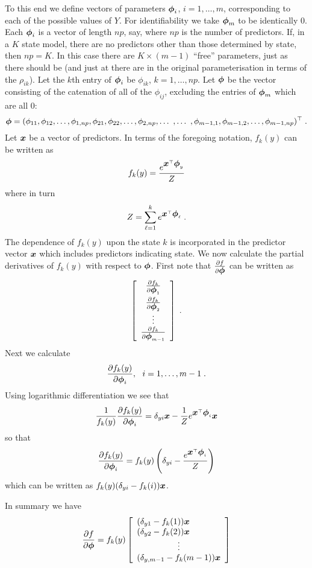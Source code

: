 To this end we define vectors of parameters $\mbox{$\boldsymbol{\phi}$}_i$, $i = 1,
\ldots, m$, corresponding to each of the possible values of $Y$.
For identifiability we take $\mbox{$\boldsymbol{\phi}$}_m$ to be identically 0.
Each $\mbox{$\boldsymbol{\phi}$}_i$ is a vector of length $np$, say, where $np$ is the
number of predictors.  If, in a $K$ state model, there are no
predictors other than those determined by state, then $np = K$.
In this case there are $K \times (m-1)$ ``free'' parameters,
just as there should be (and just at there are in the original
parameterisation in terms of the $\rho_{ik}$).  Let the $k$th
entry of $\mbox{$\boldsymbol{\phi}$}_i$ be $\phi_{ik}$, $k = 1,\ldots,np$.  Let $\mbox{$\boldsymbol{\phi}$}$
be the vector consisting of the catenation of all of the $\phi_{ij}$,
excluding the entries of $\mbox{$\boldsymbol{\phi}$}_m$ which are all 0:
\[
\mbox{$\boldsymbol{\phi}$} = (\phi_{11}, \phi_{12}, \ldots, \phi_{1,np}, \phi_{21}, \phi_{22}, \ldots,
\phi_{2,np}, \ldots\ , \ldots\ ,\phi_{m-1,1}, \phi_{m-1,2},
\ldots, \phi_{m-1,np})^{\top} \; .
\]
Let $\mbox{$\boldsymbol{x}$}$ be a vector of predictors.  In terms of the foregoing notation, $f_k(y)$
can be written as
\[
f_k(y) = \frac{e^{\mbox{$\boldsymbol{x}$}^{\top} \mbox{$\boldsymbol{\phi}$}_y}}{Z}
\]
where in turn
\[
Z = \sum_{\ell = 1}^k e^{\mbox{$\boldsymbol{x}$}^{\top} \mbox{$\boldsymbol{\phi}$}_{\ell}} \; .
\]
The dependence of $f_k(y)$ upon the state $k$ is incorporated in the
predictor vector $\mbox{$\boldsymbol{x}$}$ which includes predictors indicating state.
We now calculate the partial derivatives of $f_k(y)$ with respect to $\mbox{$\boldsymbol{\phi}$}$.
First note that $\frac{\partial f}{\partial \mbox{$\boldsymbol{\phi}$}}$ can be written as
\[
\left [ \begin{array}{c}
        \frac{\partial f_k}{\partial \mbox{$\boldsymbol{\phi}$}_1} \\[0.25cm]
        \frac{\partial f_k}{\partial \mbox{$\boldsymbol{\phi}$}_2} \\
        \vdots \\
        \frac{\partial f_k}{\partial \mbox{$\boldsymbol{\phi}$}_{m-1}} \end{array} \right ] \;.
\]
Next we calculate
\[
\frac{\partial f_k(y)}{\partial \mbox{$\boldsymbol{\phi}$}_i}, \mbox{~~} i = 1, \ldots, m-1 \; .
\]
Using logarithmic differentiation we see that
\[
\frac{1}{f_k(y)} \frac{\partial f_k(y)}{\partial \mbox{$\boldsymbol{\phi}$}_i} = \delta_{yi} \mbox{$\boldsymbol{x}$}
- \frac{1}{Z} e^{\mbox{$\boldsymbol{x}$}^{\top} \mbox{$\boldsymbol{\phi}$}_i} \mbox{$\boldsymbol{x}$}
\]
so that
\[
\frac{\partial f_k(y)}{\partial \mbox{$\boldsymbol{\phi}$}_i} = f_k(y) \left ( \delta_{yi} -
\frac{e^{\mbox{$\boldsymbol{x}$}^{\top} \mbox{$\boldsymbol{\phi}$}_i}}{Z} \right )
\]
which can be written as $f_k(y)(\delta_{yi} - f_k(i)) \mbox{$\boldsymbol{x}$}$.

In summary we have
\[
\frac{\partial f}{\partial \bphi} =
f_k(y) \left [ \begin{array}{l}
         ( \delta_{y1} - f_k(1) ) \bx \\
         ( \delta_{y2} - f_k(2) ) \bx \\
         \multicolumn{1}{c}{\vdots} \\
         ( \delta_{y,m-1} - f_k(m-1) ) \bx
     \end{array}
     \right ]
\]

